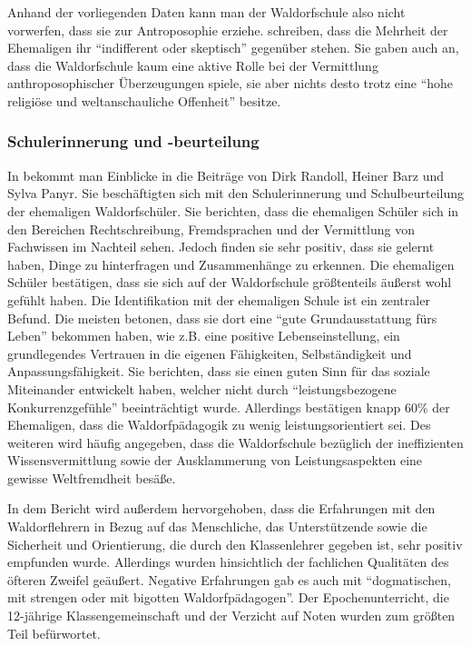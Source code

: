 Anhand der vorliegenden Daten kann man der Waldorfschule also nicht vorwerfen, dass sie zur Antroposophie erziehe. 
\citet[][S. 19]{randoll07} schreiben, dass die Mehrheit der Ehemaligen ihr \enquote{indifferent oder skeptisch} gegenüber stehen. 
Sie gaben auch an, dass die Waldorfschule kaum eine aktive Rolle bei der Vermittlung anthroposophischer Überzeugungen spiele, sie aber nichts desto trotz eine \enquote{hohe religiöse und weltanschauliche Offenheit} besitze.

\subsubsection{Schulerinnerung und -beurteilung}
\label{subsub:Erinnerung}

In \citet[][S. 19f]{randoll07} bekommt man Einblicke in die Beiträge von Dirk Randoll, Heiner Barz und Sylva Panyr. 
Sie beschäftigten sich mit den Schulerinnerung und Schulbeurteilung der ehemaligen Waldorfschüler. 
Sie berichten, dass die ehemaligen Schüler sich in den Bereichen Rechtschreibung, Fremdsprachen und der Vermittlung von Fachwissen im Nachteil sehen. 
Jedoch finden sie sehr positiv, dass sie gelernt haben, Dinge zu hinterfragen und Zusammenhänge zu erkennen. 
Die ehemaligen Schüler bestätigen, dass sie sich auf der Waldorfschule größtenteils äußerst wohl gefühlt haben. 
Die Identifikation mit der ehemaligen Schule ist ein zentraler Befund. 
Die meisten betonen, dass sie dort eine \enquote{gute Grundausstattung fürs Leben} bekommen haben, wie z.B. eine positive Lebenseinstellung, ein grundlegendes Vertrauen in die eigenen Fähigkeiten, Selbständigkeit und Anpassungsfähigkeit. 
Sie berichten, dass sie einen guten Sinn für das soziale Miteinander entwickelt haben, welcher nicht durch \enquote{leistungsbezogene Konkurrenzgefühle} beeinträchtigt wurde. 
Allerdings bestätigen knapp 60\% der Ehemaligen, dass die Waldorfpädagogik zu wenig leistungsorientiert sei. 
Des weiteren wird häufig angegeben, dass die Waldorfschule bezüglich der ineffizienten Wissensvermittlung sowie der Ausklammerung von Leistungsaspekten eine gewisse Weltfremdheit besäße. 

In dem Bericht wird außerdem hervorgehoben, dass die Erfahrungen mit den Waldorflehrern in Bezug auf das Menschliche, das Unterstützende sowie die Sicherheit und Orientierung, die durch den Klassenlehrer gegeben ist, sehr positiv empfunden wurde. 
Allerdings wurden hinsichtlich der fachlichen Qualitäten des öfteren Zweifel geäußert. 
Negative Erfahrungen gab es auch mit \enquote{dogmatischen, mit strengen oder mit bigotten Waldorfpädagogen}. 
Der Epochenunterricht, die 12-jährige Klassengemeinschaft und der Verzicht auf Noten wurden zum größten Teil befürwortet. 














